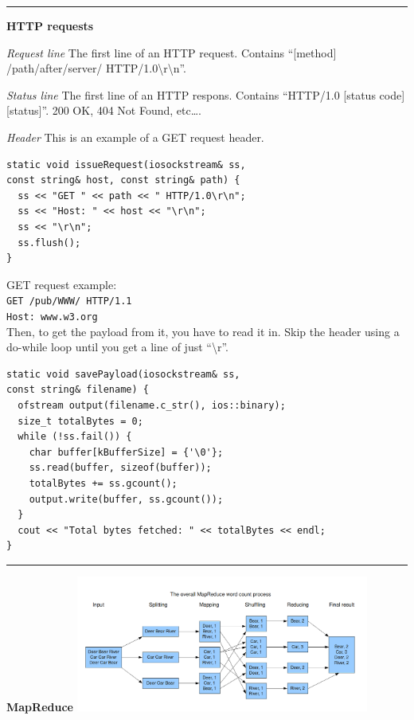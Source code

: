 \documentclass{article}
\begin{document}
\begin{multicols}{2}
  \noindent\rule{4cm}{0.4pt}

  {\bf HTTP requests}

  {\it Request line} The first line of an HTTP request. Contains ``[method]
  /path/after/server/ HTTP/1.0\textbackslash r\textbackslash n''.

  {\it Status line} The first line of an HTTP respons. Contains ``HTTP/1.0
  [status code] [status]''. 200 OK, 404 Not Found, etc\dots.

  {\it Header}
  This is an example of a GET request header.
  \begin{verbatim}
static void issueRequest(iosockstream& ss,
const string& host, const string& path) {
  ss << "GET " << path << " HTTP/1.0\r\n";
  ss << "Host: " << host << "\r\n";
  ss << "\r\n";
  ss.flush();
}  \end{verbatim}
  GET request example:\\
  {\tt GET /pub/WWW/ HTTP/1.1\\
  Host: www.w3.org}\\
  Then, to get the payload from it, you have to read it in. Skip the header
  using a do-while loop until you get a line of just ``\textbackslash r''.
  \begin{verbatim}
static void savePayload(iosockstream& ss,
const string& filename) {
  ofstream output(filename.c_str(), ios::binary);
  size_t totalBytes = 0;
  while (!ss.fail()) {
    char buffer[kBufferSize] = {'\0'};
    ss.read(buffer, sizeof(buffer));
    totalBytes += ss.gcount();
    output.write(buffer, ss.gcount());
  }
  cout << "Total bytes fetched: " << totalBytes << endl;
}
\end{verbatim}

  \noindent\rule{4cm}{0.4pt}

  {\bf MapReduce}
  \includegraphics[width=3.8in]{mr.png}
\end{multicols}
\end{document}
